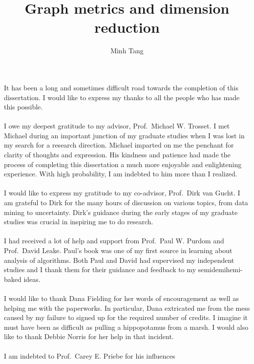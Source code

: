 \documentclass[12pt,reqno,final,ugsabstract,ugsabstractsigs]{iuthesis}
\theoremstyle{definition}
\numberwithin{equation}{chapter}
\numberwithin{section}{chapter}
\begin{document}
\title{Graph metrics and dimension reduction}
\author{Minh Tang}
\setcounter{page}{2}
%
\begin{acknowledgements}
  It has been a long and sometimes difficult road towards the
  completion of this dissertation. I would like to express my thanks
  to all the people who has made this possible. \\ \\
%
  \noindent I owe my deepest gratitude to my advisor, Prof.~Michael
  W.  Trosset. I met Michael during an important junction of my
  graduate studies when I was lost in my search for a research
  direction.  Michael imparted on me the penchant for clarity of
  thoughts and expression. His kindness and patience had made the
  process of completing this dissertation a much more enjoyable and
  enlightening experience. With high probability, I am indebted to him
  more than I realized. \\ \\
%
  \noindent I would like to express my gratitude to my co-advisor,
  Prof.~Dirk van Gucht. I am grateful to Dirk for the many hours of
  discussion on various topics, from data mining to
  uncertainty. Dirk's guidance during the early stages of my graduate
  studies was crucial in inspiring me to do research. \\ \\
%
  \noindent I had received a lot of help and support from Prof.~Paul
  W. Purdom and Prof.~David Leake. Paul's book was one of my first
  source in learning about analysis of algorithms. Both Paul and David
  had supervised my independent studies and I thank them for their
  guidance and feedback to my semidemihemi-baked ideas. \\ \\
%
  \noindent I would like to thank Dana Fielding for her words of
  encouragement as well as helping me with the paperworks. In
  particular, Dana extricated me from the mess caused by my failure to
  signed up for the required number of credits. I imagine it must have
  been as difficult as pulling a hippopotamus from a marsh. I would
  also like to thank Debbie Norris for her help in that incident. \\ \\
%
  \noindent I am indebted to Prof.~Carey E. Priebe for his influences

\end{acknowledgements}
\end{document}
